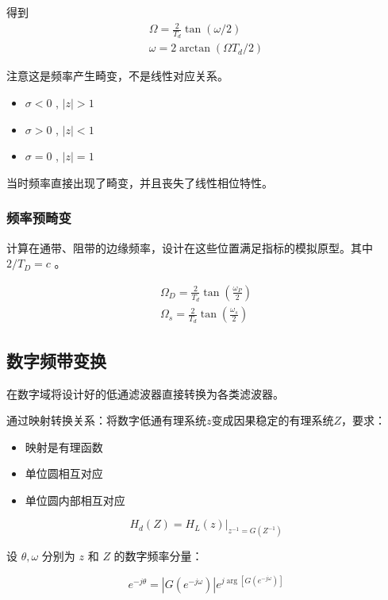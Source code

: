 \documentclass[cn,11pt,chinese,black,simple]{elegantbook}
\begin{document}
得到 \[
    \begin{array}{l}
    \Omega=\frac{2}{T_{d}} \tan (\omega / 2) \\
    \omega=2 \arctan \left(\Omega T_{d} / 2\right)
    \end{array}
    \]

注意这是频率产生畸变，不是线性对应关系。


\begin{itemize}
    \item \(\sigma < 0\) ,  \(|z| > 1\) 
    \item \(\sigma > 0\) ,  \(|z| < 1\) 
    \item \(\sigma = 0\) ,  \(|z| = 1\) 
\end{itemize}


当时频率直接出现了畸变，并且丧失了线性相位特性。

\subsubsection{频率预畸变}

计算在通带、阻带的边缘频率，设计在这些位置满足指标的模拟原型。其中 \( 2 / T_D = c\) 。

\[
    \begin{array}{l}
        \Omega_{D}=\frac{2}{T_{d}} \tan \left(\frac{\omega_{P}}{2}\right) \\
        \Omega_{s}=\frac{2}{T_{d}} \tan \left(\frac{\omega_{s}}{2}\right)
        \end{array}\]

\subsection{数字频带变换}

在数字域将设计好的低通滤波器直接转换为各类滤波器。


通过映射转换关系：将数字低通有理系统\(z\)变成因果稳定的有理系统\(Z\)，要求：

\begin{itemize}
    \item 映射是有理函数
    \item 单位圆相互对应
    \item 单位圆内部相互对应
\end{itemize}

\[H_{d}(Z)=\left.H_{L}(z)\right|_{z^{-1}=G\left(Z^{-1}\right)}\]

设 \(\theta, \omega\) 分别为 \(z\) 和 \(Z\) 的数字频率分量：

\[
e^{-j \theta}=\left|G\left(e^{-j \omega}\right)\right| e^{j \arg \left[G\left(e^{-j \omega}\right)\right]}
\]
\end{document}
